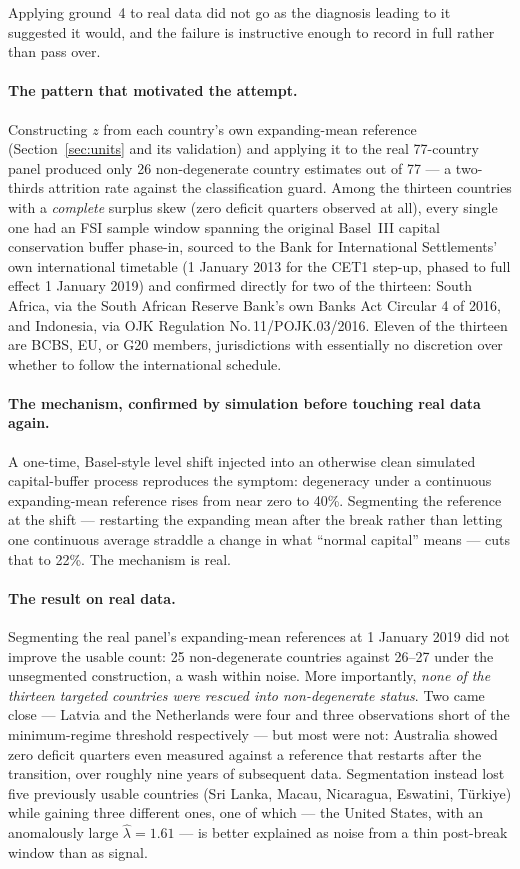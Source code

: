 \documentclass[11pt]{article}
\begin{document}
Applying ground~4 to real data did not go as the diagnosis leading to it
suggested it would, and the failure is instructive enough to record in
full rather than pass over.

\paragraph{The pattern that motivated the attempt.} Constructing $z$ from
each country's own expanding-mean reference (Section~\ref{sec:units} and
its validation) and applying it to the real 77-country panel produced only
26 non-degenerate country estimates out of 77 --- a two-thirds attrition
rate against the classification guard. Among the thirteen countries with a
\emph{complete} surplus skew (zero deficit quarters observed at all), every
single one had an FSI sample window spanning the original Basel~III capital
conservation buffer phase-in, sourced to the Bank for International
Settlements' own international timetable (1 January 2013 for the CET1
step-up, phased to full effect 1 January 2019) and confirmed directly for
two of the thirteen: South Africa, via the South African Reserve Bank's own
Banks Act Circular 4 of 2016, and Indonesia, via OJK Regulation
No.\,11/POJK.03/2016. Eleven of the thirteen are BCBS, EU, or G20 members,
jurisdictions with essentially no discretion over whether to follow the
international schedule.

\paragraph{The mechanism, confirmed by simulation before touching real data
again.} A one-time, Basel-style level shift injected into an otherwise
clean simulated capital-buffer process reproduces the symptom: degeneracy
under a continuous expanding-mean reference rises from near zero to 40\%.
Segmenting the reference at the shift --- restarting the expanding mean
after the break rather than letting one continuous average straddle a
change in what ``normal capital'' means --- cuts that to 22\%. The
mechanism is real.

\paragraph{The result on real data.} Segmenting the real panel's
expanding-mean references at 1 January 2019 did not improve the usable
count: 25 non-degenerate countries against 26--27 under the unsegmented
construction, a wash within noise. More importantly, \emph{none of the
thirteen targeted countries were rescued into non-degenerate status}. Two
came close --- Latvia and the Netherlands were four and three observations
short of the minimum-regime threshold respectively --- but most were not:
Australia showed zero deficit quarters even measured against a reference
that restarts after the transition, over roughly nine years of subsequent
data. Segmentation instead lost five previously usable countries (Sri
Lanka, Macau, Nicaragua, Eswatini, T\"urkiye) while gaining three different
ones, one of which --- the United States, with an anomalously large
$\hat\lambda = 1.61$ --- is better explained as noise from a thin
post-break window than as signal.
\end{document}

